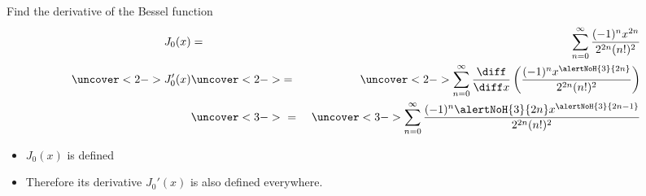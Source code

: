 \begin{frame}
\begin{example} %
Find the derivative of the Bessel function
\abovedisplayskip=0pt
\belowdisplayskip=0pt
\begin{eqnarray*}
J_0(x) & = & \sum_{n=0}^\infty \frac{(-1)^n x^{2n}}{2^{2n}(n!)^2}\\%
\uncover<2->{%
J_0'(x)%
}%
 & \uncover<2->{ = } &%
\uncover<2->{%
\sum_{n=0}^\infty \frac{\diff}{\diff x}\left( \frac{(-1)^n x^{\alertNoH{ 3}{ 2n}}}{2^{2n}(n!)^2}\right) %
}\\%
 & \uncover<3->{\  = \ } &%
\uncover<3->{%
\sum_{n=0}^\infty \frac{(-1)^n \alertNoH{ 3}{2n}x^{\alertNoH{ 3}{ 2n -1}}}{2^{2n}(n!)^2}%
}%
\end{eqnarray*}
\begin{itemize}
\item<4-| alert@4-5>  $J_0(x)$ is defined 
\item<6->  Therefore its derivative $J_0'(x)$ is also defined everywhere.
\end{itemize}
\end{example}
\end{frame}
